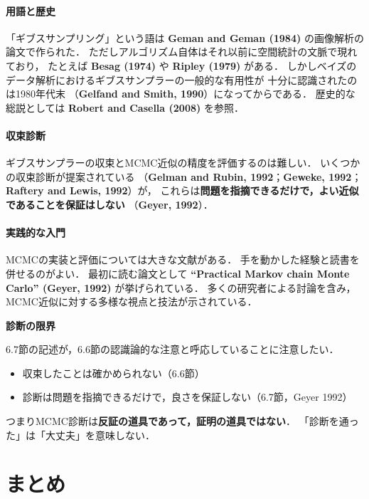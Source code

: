 \documentclass[lualatex,ja=standard,a4paper,12pt]{bxjsarticle}
\begin{document}
\paragraph{用語と歴史}
「ギブスサンプリング」という語は
\textbf{Geman and Geman (1984)} の画像解析の論文で作られた．
ただしアルゴリズム自体はそれ以前に空間統計の文脈で現れており，
たとえば \textbf{Besag (1974)} や \textbf{Ripley (1979)} がある．
しかしベイズのデータ解析におけるギブスサンプラーの一般的な有用性が
十分に認識されたのは1980年代末
（\textbf{Gelfand and Smith, 1990}）になってからである．
歴史的な総説としては \textbf{Robert and Casella (2008)} を参照．

\paragraph{収束診断}
ギブスサンプラーの収束とMCMC近似の精度を評価するのは難しい．
いくつかの収束診断が提案されている
（\textbf{Gelman and Rubin, 1992}；\textbf{Geweke, 1992}；
\textbf{Raftery and Lewis, 1992}）が，
これらは\textbf{問題を指摘できるだけで，よい近似であることを保証はしない}
（\textbf{Geyer, 1992}）．

\paragraph{実践的な入門}
MCMCの実装と評価については大きな文献がある．
手を動かした経験と読書を併せるのがよい．
最初に読む論文として
\textbf{``Practical Markov chain Monte Carlo'' (Geyer, 1992)} が挙げられている．
多くの研究者による討論を含み，MCMC近似に対する多様な視点と技法が示されている．

\begin{warningbox}
\textbf{診断の限界}

6.7節の記述が，6.6節の認識論的な注意と呼応していることに注意したい．
\begin{itemize}
  \item 収束したことは確かめられない（6.6節）
  \item 診断は問題を指摘できるだけで，良さを保証しない（6.7節，Geyer 1992）
\end{itemize}
つまりMCMC診断は\textbf{反証の道具であって，証明の道具ではない}．
「診断を通った」は「大丈夫」を意味しない．
\end{warningbox}

\section{まとめ}
\end{document}
